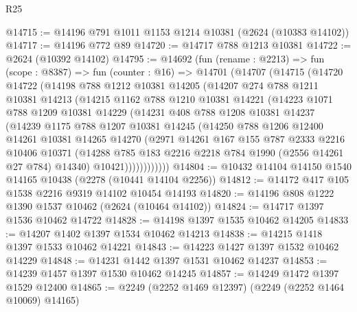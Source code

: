 \begin{lexlean}{R25}
\begin{coremodule}
@14715 := @14196 @791 @1011 @1153 @1214 @10381 (@2624 (@10383 @14102))
@14717 := @14196 @772 @89
@14720 := @14717 @788 @1213 @10381
@14722 := @2624 (@10392 @14102)
@14795 := @14692
    (fun (rename : @2213) =>
    fun (scope : @8387) =>
    fun (counter : @16) =>
    @14701
      (@14707
        (@14715
          (@14720
            @14722
            (@14198
              @788
              @1212
              @10381
              @14205
              (@14207
                @274
                @788
                @1211
                @10381
                @14213
                (@14215
                  @1162
                  @788
                  @1210
                  @10381
                  @14221
                  (@14223
                    @1071
                    @788
                    @1209
                    @10381
                    @14229
                    (@14231
                      @408
                      @788
                      @1208
                      @10381
                      @14237
                      (@14239
                        @1175
                        @788
                        @1207
                        @10381
                        @14245
                        (@14250
                          @788
                          @1206
                          @12400
                          @14261
                          @10381
                          @14265
                          @14270
                          (@2971
                            @14261
                            @167
                            @155
                            @787
                            @2333
                            @2216
                            @10406
                            @10371
                            (@14288 @785 @183 @2216 @2218 @784 @1990 (@2556 @14261 @27 @784) @14340)
                            @10421))))))))))))
@14804 := @10432 @14104 @14150 @1540 @14165 @10438 (@2278 (@10441 @14104 @2256))
@14812 := @14172 @417 @105 @1538 @2216 @9319 @14102 @10454 @14193
@14820 := @14196 @808 @1222 @1390 @1537 @10462 (@2624 (@10464 @14102))
@14824 := @14717 @1397 @1536 @10462 @14722
@14828 := @14198 @1397 @1535 @10462 @14205
@14833 := @14207 @1402 @1397 @1534 @10462 @14213
@14838 := @14215 @1418 @1397 @1533 @10462 @14221
@14843 := @14223 @1427 @1397 @1532 @10462 @14229
@14848 := @14231 @1442 @1397 @1531 @10462 @14237
@14853 := @14239 @1457 @1397 @1530 @10462 @14245
@14857 := @14249 @1472 @1397 @1529 @12400
@14865 := @2249 (@2252 @1469 @12397) (@2249 (@2252 @1464 @10069) @14165)

\end{coremodule}
\end{lexlean}
